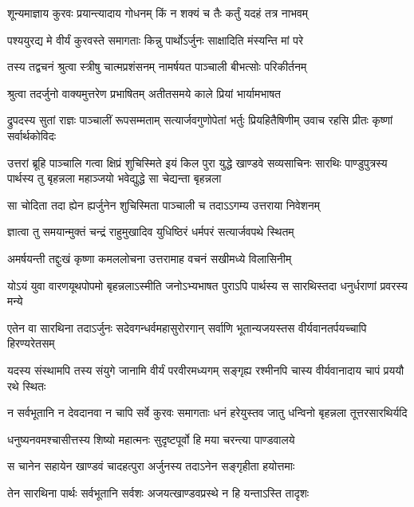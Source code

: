 \twolineshloka
{शून्यमाज्ञाय कुरवः प्रयान्त्यादाय गोधनम्}
{किं न शक्यं च तैः कर्तुं यदहं तत्र नाभवम्}


\twolineshloka
{पश्ययुरद्य मे वीर्यं कुरवस्ते समागताः}
{किन्नु पार्थोऽर्जुनः साक्षादिति मंस्यन्ति मां परे}




\twolineshloka
{तस्य तद्वचनं श्रुत्वा स्त्रीषु चात्मप्रशंसनम्}
{नामर्षयत पाञ्चाली बीभत्सोः परिकीर्तनम्}


\twolineshloka
{श्रुत्वा तदर्जुनो वाक्यमुत्तरेण प्रभाषितम्}
{अतीतसमये काले प्रियां भार्यामभाषत}


\threelineshloka
{द्रुपदस्य सुतां राज्ञः पाञ्चालीं रूपसम्मताम्}
{सत्यार्जवगुणोपेतां भर्तुः प्रियहितैषिणीम्}
{उवाच रहसि प्रीतः कृष्णां सर्वार्थकोविदः}


\onelineshloka
{उत्तरां ब्रूहि पाञ्चालि गत्वा क्षिप्रं शुचिस्मिते}
\threelineshloka
{इयं किल पुरा युद्धे खाण्डवे सव्यसाचिनः}
{सारथिः पाण्डुपुत्रस्य पार्थस्य तु बृहन्नला}
{महाञ्जयो भवेद्युद्धे सा चेद्यन्ता बृहन्नला}



\twolineshloka
{सा चोदिता तदा ह्येन ह्यर्जुनेन शुचिस्मिता}
{पाञ्चाली च तदाऽऽगम्य उत्तराया निवेशनम्}


\twolineshloka
{ज्ञात्वा तु समयान्मुक्तं चन्द्रं राहुमुखादिव}
{युधिष्ठिरं धर्मपरं सत्यार्जवपथे स्थितम्}


\twolineshloka
{अमर्षयन्ती तद्दुःखं कृष्णा कमललोचना}
{उत्तरामाह वचनं सखीमध्ये विलासिनीम्}


\twolineshloka
{योऽयं युवा वारणयूथपोपमो बृहन्नलाऽस्मीति जनोऽभ्यभाषत}
{पुराऽपि पार्थस्य स सारथिस्तदा धनुर्धराणां प्रवरस्य मन्ये}


\twolineshloka
{एतेन वा सारथिना तदाऽर्जुनः सदेवगन्धर्वमहासुरोरगान्}
{सर्वाणि भूतान्यजयस्तस वीर्यवानतर्पयच्चापि हिरण्यरेतसम्}


\twolineshloka
{यदस्य संस्थामपि तस्य संयुगे जानामि वीर्यं परवीरमध्यगम्}
{सङ्गृह्य रश्मीनपि चास्य वीर्यवानादाय चापं प्रययौ रथे स्थितः}


\twolineshloka
{न सर्वभूतानि न देवदानवा न चापि सर्वे कुरवः समागताः}
{धनं हरेयुस्तव जातु धन्विनो बृहन्नला तूत्तरसारथिर्यदि}


\twolineshloka
{धनुष्यनवमश्चासीत्तस्य शिष्यो महात्मनः}
{सुदृष्टपूर्वो हि मया चरन्त्या पाण्डवालये}


\twolineshloka
{स चानेन सहायेन खाण्डवं चादहत्पुरा}
{अर्जुनस्य तदाऽनेन सङ्गृहीता हयोत्तमाः}


\twolineshloka
{तेन सारथिना पार्थः सर्वभूतानि सर्वशः}
{अजयत्खाण्डवप्रस्थे न हि यन्ताऽस्ति तादृशः}



